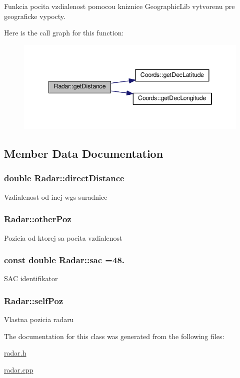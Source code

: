 Funkcia pocita vzdialenost pomocou kniznice Geographic\-Lib vytvorenu pre geograficke vypocty. 

Here is the call graph for this function\-:
\nopagebreak
\begin{figure}[H]
\begin{center}
\leavevmode
\includegraphics[width=346pt]{classRadar_acd5a884b01ca6a2f63fd2e09a2521709_cgraph}
\end{center}
\end{figure}




\subsection{Member Data Documentation}
\hypertarget{classRadar_a462d860ac5b4af6246074aae7082c94c}{
\subsubsection[{direct\-Distance}]{\setlength{\rightskip}{0pt plus 5cm}double Radar\-::direct\-Distance}}\label{classRadar_a462d860ac5b4af6246074aae7082c94c}
Vzdialenost od inej wgs suradnice \hypertarget{classRadar_aed5172c436c4a1803d6d9f978f3eee02}{
\subsubsection[{other\-Poz}]{ Radar\-::other\-Poz}}\label{classRadar_aed5172c436c4a1803d6d9f978f3eee02}
Pozicia od ktorej sa pocita vzdialenost \hypertarget{classRadar_ab545a02c2a5d688cb520115fc0e4dcf4}{
\subsubsection[{sac}]{\setlength{\rightskip}{0pt plus 5cm}const double Radar\-::sac =48.}}\label{classRadar_ab545a02c2a5d688cb520115fc0e4dcf4}
S\-A\-C identifikator \hypertarget{classRadar_a2475d8141970088a5a6aa92eb0f6535d}{
\subsubsection[{self\-Poz}]{ Radar\-::self\-Poz}}\label{classRadar_a2475d8141970088a5a6aa92eb0f6535d}
Vlastna pozicia radaru 

The documentation for this class was generated from the following files\-:\begin{DoxyCompactItemize}
\item 
\hyperlink{radar_8h}{radar.\-h}\item 
\hyperlink{radar_8cpp}{radar.\-cpp}\end{DoxyCompactItemize}
